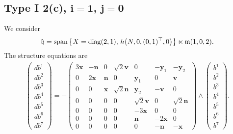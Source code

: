 \documentclass[11pt]{article}
\numberwithin{equation}{section}
\newcommand\fh{{\frak h}}
\newcommand\fm{{\frak m}}
\newcommand\bx{{\mathbf x}}
\newcommand\by{{\mathbf y}}
\newcommand\bn{{\mathbf n}}
\newcommand\bv{{\mathbf v}}
\newcommand{\Span}{\operatorname{span}}
\newcommand{\diag}{\operatorname{diag}}
\begin{document}
\subsection[Type I 2(c), $i=1$, $j=0$]{Type I 2(c), $\boldsymbol{i=1}$, $\boldsymbol{j=0}$}
We consider
\begin{gather*}\fh=\Span\big\{X=\diag(2,1),\, h\big(N,0,(0,1)^\top,0\big) \big\}\ltimes\fm(1,0,2).\end{gather*}
The structure equations are
\begin{gather}\label{EI2(c)i=1}\left(\begin{matrix} db^1\\db^2\\db^3\\db^4\\db^5\\db^6\\db^7\end{matrix}\right) = -\left(
\begin{matrix}
3{\bx} &-\bn&0&\sqrt2 \bv&0&-\by_1&-\by_2\\
0&2\bx&\bn&0&\by_1&0&\bv\\
0&0&\bx&\sqrt 2 \bn&\by_2&-\bv&0\\
0&0&0&0&\sqrt2 \bv&0&\sqrt 2 \bn\\
0&0&0&0&-3\bx&0&0\\
0&0&0&0&\bn&-2\bx&0\\
0&0&0&0&0&-\bn&-\bx
\end{matrix}\right) \wedge \left(\begin{matrix} b^1\\b^2\\b^3\\b^4\\b^5\\b^6\\b^7\end{matrix}\right).
\end{gather}
\end{document}
